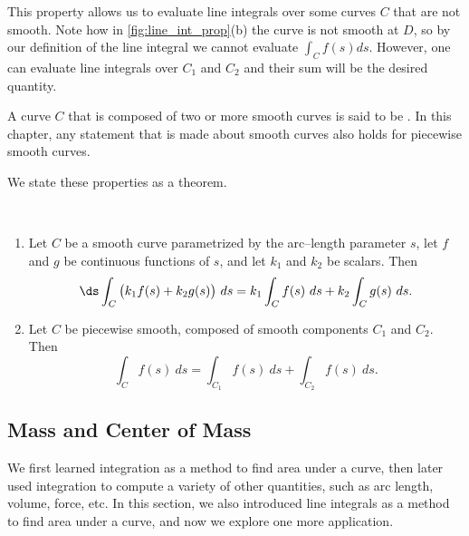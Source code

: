 This property allows us to evaluate line integrals over some curves $C$ that are not smooth. Note how in \autoref{fig:line_int_prop}(b) the curve is not smooth at $D$, so by our definition of the line integral we cannot evaluate $\int_C f(s)ds$. However, one can evaluate line integrals over $C_1$ and $C_2$ and their sum will be the desired quantity.

A curve $C$ that is composed of two or more smooth curves is said to be . In this chapter, any statement that is made about smooth curves also holds for piecewise smooth curves.


We state these properties as a theorem.

{%
\mbox{}\\[-2\baselineskip]\begin{enumerate}
	\item	Let $C$ be a smooth curve parametrized by the arc--length parameter $s$, let $f$ and $g$ be continuous functions of $s$, and let $k_1$ and $k_2$ be scalars. Then
\[\ds \int_C\big(k_1f(s)+k_2g(s)\big)\ ds = k_1\int_Cf(s)\ ds +k_2\int_Cg(s)\ ds.\]
	\item Let $C$ be piecewise smooth, composed of smooth components $C_1$ and $C_2$. Then
\[\int_Cf(s)\ ds = \int_{C_1}f(s)\ ds + \int_{C_2}f(s)\ ds.\]
\end{enumerate}}

\subsection{Mass and Center of Mass}

We first learned integration as a method to find area under a curve, then later used integration to compute a variety of other quantities, such as arc length, volume, force, etc. In this section, we also introduced line integrals as a method to find area under a curve, and now we explore one more application.

